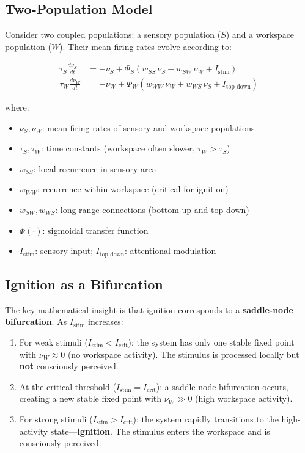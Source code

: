\documentclass[11pt,a4paper]{report}
\begin{document}
\subsection{Two-Population Model}

Consider two coupled populations: a sensory population ($S$) and a workspace population ($W$). Their mean firing rates evolve according to:

\begin{mathbox}
\vspace{-6pt}
\begin{align}
  \tau_S \frac{d\nu_S}{dt} &= -\nu_S + \Phi_S\!\left(w_{SS}\,\nu_S + w_{SW}\,\nu_W + I_{\text{stim}}\right) \label{eq:sensory}\\[6pt]
  \tau_W \frac{d\nu_W}{dt} &= -\nu_W + \Phi_W\!\left(w_{WW}\,\nu_W + w_{WS}\,\nu_S + I_{\text{top-down}}\right) \label{eq:workspace}
\end{align}
\vspace{-8pt}
\end{mathbox}

where:
\begin{itemize}[leftmargin=1.5em]
  \item $\nu_S, \nu_W$: mean firing rates of sensory and workspace populations
  \item $\tau_S, \tau_W$: time constants (workspace often slower, $\tau_W > \tau_S$)
  \item $w_{SS}$: local recurrence in sensory area
  \item $w_{WW}$: recurrence within workspace (critical for ignition)
  \item $w_{SW}, w_{WS}$: long-range connections (bottom-up and top-down)
  \item $\Phi(\cdot)$: sigmoidal transfer function
  \item $I_{\text{stim}}$: sensory input; $I_{\text{top-down}}$: attentional modulation
\end{itemize}

\subsection{Ignition as a Bifurcation}

The key mathematical insight is that ignition corresponds to a \textbf{saddle-node bifurcation}. As $I_{\text{stim}}$ increases:

\begin{enumerate}[leftmargin=2em]
  \item For weak stimuli ($I_{\text{stim}} < I_{\text{crit}}$): the system has only one stable fixed point with $\nu_W \approx 0$ (no workspace activity). The stimulus is processed locally but \textbf{not} consciously perceived.
  \item At the critical threshold ($I_{\text{stim}} = I_{\text{crit}}$): a saddle-node bifurcation occurs, creating a new stable fixed point with $\nu_W \gg 0$ (high workspace activity).
  \item For strong stimuli ($I_{\text{stim}} > I_{\text{crit}}$): the system rapidly transitions to the high-activity state---\textbf{ignition}. The stimulus enters the workspace and is consciously perceived.
\end{enumerate}
\end{document}
